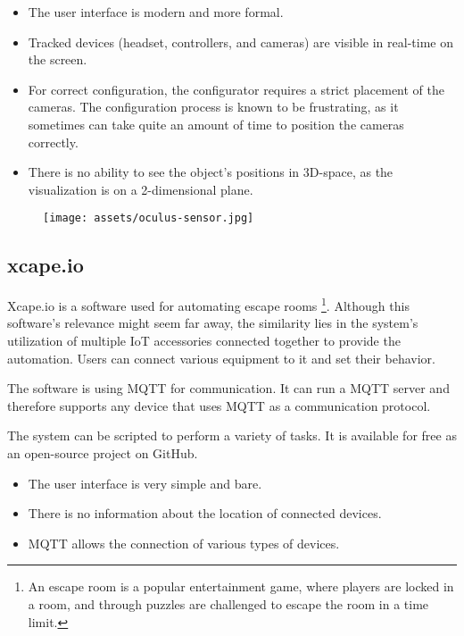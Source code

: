 \begin{itemize}
\item The user interface is modern and more formal.
\item Tracked devices (headset, controllers, and cameras) are visible in real-time
on the screen.
\item For correct configuration, the configurator requires a strict placement
of the cameras. The configuration process is known to be frustrating,
as it sometimes can take quite an amount of time to position the cameras correctly.
\item There is no ability to see the object’s positions in 3D-space, as the visualization is
on a 2-dimensional plane.
\end{itemize}


\begin{figure}[h]{}
\centering\texttt{[image: assets/oculus-sensor.jpg]}
\caption{}

\end{figure}

\hypertarget{x-xcape.io}{\subsection{xcape.io}}
Xcape.io is a software used for automating escape rooms
\footnote{An escape room is a popular entertainment game, where players are locked in a room, and through puzzles are challenged to escape the room in a time limit.}.
Although this software’s relevance might seem far away,
the similarity lies in the system’s utilization of multiple IoT accessories
connected together to provide the automation. Users can connect various
equipment to it and set their behavior.


The software is using MQTT for communication. It can run a MQTT server and
therefore supports any device that uses MQTT as a communication protocol.


The system can be scripted to perform a variety of tasks. It is available
for free as an open-source project on GitHub.


\begin{itemize}

\item The user interface is very simple and bare.

\item There is no information about the location of connected devices.

\item MQTT allows the connection of various types of devices.

\end{itemize}
